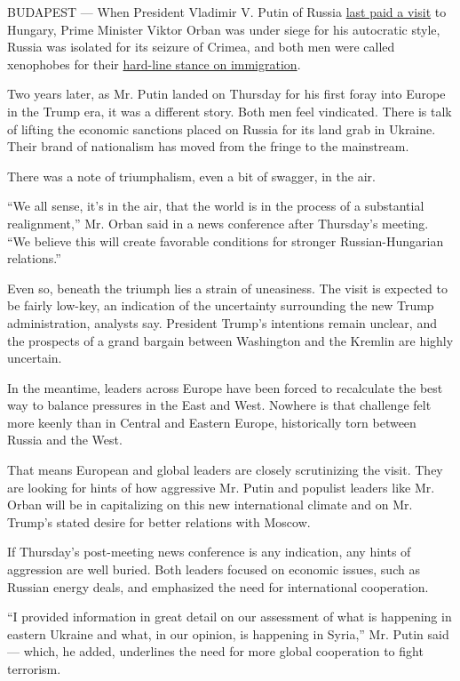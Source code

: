BUDAPEST --- When President Vladimir V. Putin of Russia
\href{https://www.nytimes.com/2015/02/18/world/hungary-keeps-visit-by-putin-low-key-as-it-seeks-to-repair-relations-with-west.html}{last
paid a visit} to Hungary, Prime Minister Viktor Orban was under siege
for his autocratic style, Russia was isolated for its seizure of Crimea,
and both men were called xenophobes for their
\href{https://www.nytimes.com/2016/11/09/world/europe/hungary-refugee-crisis-ban.html}{hard-line
stance on immigration}.

Two years later, as Mr. Putin landed on Thursday for his first foray
into Europe in the Trump era, it was a different story. Both men feel
vindicated. There is talk of lifting the economic sanctions placed on
Russia for its land grab in Ukraine. Their brand of nationalism has
moved from the fringe to the mainstream.

There was a note of triumphalism, even a bit of swagger, in the air.

``We all sense, it's in the air, that the world is in the process of a
substantial realignment,'' Mr. Orban said in a news conference after
Thursday's meeting. ``We believe this will create favorable conditions
for stronger Russian-Hungarian relations.''

Even so, beneath the triumph lies a strain of uneasiness. The visit is
expected to be fairly low-key, an indication of the uncertainty
surrounding the new Trump administration, analysts say. President
Trump's intentions remain unclear, and the prospects of a grand bargain
between Washington and the Kremlin are highly uncertain.

In the meantime, leaders across Europe have been forced to recalculate
the best way to balance pressures in the East and West. Nowhere is that
challenge felt more keenly than in Central and Eastern Europe,
historically torn between Russia and the West.

That means European and global leaders are closely scrutinizing the
visit. They are looking for hints of how aggressive Mr. Putin and
populist leaders like Mr. Orban will be in capitalizing on this new
international climate and on Mr. Trump's stated desire for better
relations with Moscow.

If Thursday's post-meeting news conference is any indication, any hints
of aggression are well buried. Both leaders focused on economic issues,
such as Russian energy deals, and emphasized the need for international
cooperation.

``I provided information in great detail on our assessment of what is
happening in eastern Ukraine and what, in our opinion, is happening in
Syria,'' Mr. Putin said --- which, he added, underlines the need for
more global cooperation to fight terrorism.

